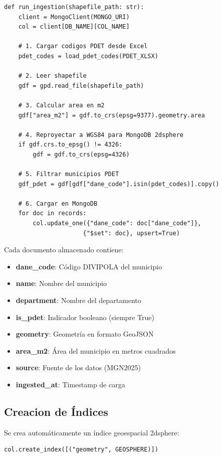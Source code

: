 \documentclass[12pt,a4paper]{article}
\begin{document}
\begin{lstlisting}[caption=Proceso de ingesta de datos]
def run_ingestion(shapefile_path: str):
    client = MongoClient(MONGO_URI)
    col = client[DB_NAME][COL_NAME]

    # 1. Cargar codigos PDET desde Excel
    pdet_codes = load_pdet_codes(PDET_XLSX)

    # 2. Leer shapefile
    gdf = gpd.read_file(shapefile_path)
    
    # 3. Calcular area en m2
    gdf["area_m2"] = gdf.to_crs(epsg=9377).geometry.area

    # 4. Reproyectar a WGS84 para MongoDB 2dsphere
    if gdf.crs.to_epsg() != 4326:
        gdf = gdf.to_crs(epsg=4326)

    # 5. Filtrar municipios PDET
    gdf_pdet = gdf[gdf["dane_code"].isin(pdet_codes)].copy()
    
    # 6. Cargar en MongoDB
    for doc in records:
        col.update_one({"dane_code": doc["dane_code"]}, 
                      {"$set": doc}, upsert=True)
\end{lstlisting}

Cada documento almacenado contiene:
\begin{itemize}
  \item \textbf{dane\_code}: Código DIVIPOLA del municipio
  \item \textbf{name}: Nombre del municipio
  \item \textbf{department}: Nombre del departamento
  \item \textbf{is\_pdet}: Indicador booleano (siempre True)
  \item \textbf{geometry}: Geometría en formato GeoJSON
  \item \textbf{area\_m2}: Área del municipio en metros cuadrados
  \item \textbf{source}: Fuente de los datos (MGN2025)
  \item \textbf{ingested\_at}: Timestamp de carga
\end{itemize}

\subsection{Creacion de Índices}

Se crea automáticamente un índice geoespacial 2dsphere:

\begin{lstlisting}[caption=Creacion de indice 2dsphere]
col.create_index([("geometry", GEOSPHERE)])
\end{lstlisting}
\end{document}
